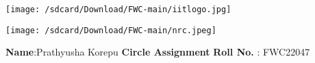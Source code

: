 \documentclass[10pt,a4paper]{report}
\begin{document}
\begin{figure*}[!tbp]
  \centering
  \begin{minipage}[b]{0.4\textwidth}
   \texttt{[image: /sdcard/Download/FWC-main/iitlogo.jpg]} 
  \end{minipage}
  \hfill
  \vspace{5mm}\begin{minipage}[b]{0.4\textwidth}
\raggedleft \texttt{[image: /sdcard/Download/FWC-main/nrc.jpeg]} 

  \end{minipage}\vspace{0.2cm}
\end{figure*}
\raggedright \textbf{Name}:\hspace{1mm}Prathyusha Korepu\hspace{3cm} \Large \textbf{Circle Assignment}\hspace{2.5cm} %
\normalsize \textbf{Roll No.} :\hspace{1mm} FWC22047\vspace{1cm}
\end{document}
